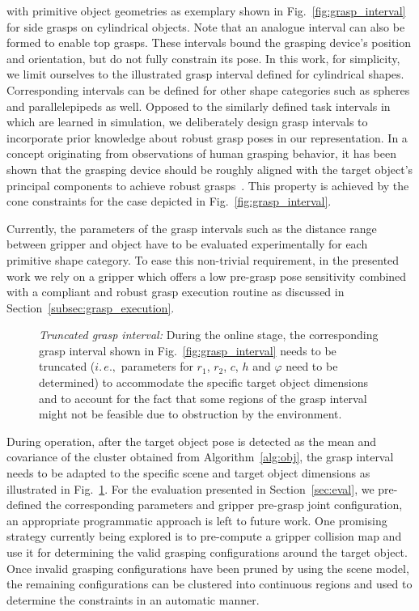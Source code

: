 with primitive object geometries as exemplary shown in Fig.~\ref{fig:grasp_interval} for side grasps
on cylindrical objects. Note that an analogue interval can also be formed to enable top
grasps. These intervals bound the grasping device's position and orientation, but do not fully
constrain its pose. In this work, for simplicity, we limit ourselves to the illustrated grasp
interval defined for cylindrical shapes. Corresponding intervals can be defined for other shape
categories such as spheres and parallelepipeds as well. Opposed to the similarly defined task
intervals in~\cite{Gien08a, Gien08b} which are learned in simulation, we deliberately design grasp
intervals to incorporate prior knowledge about robust grasp poses in our representation. In a
concept originating from observations of human grasping behavior, it has been shown that the
grasping device should be roughly aligned with the target object's principal components to achieve
robust grasps~\cite{Bala12}. This property is achieved by the cone constraints for the case depicted
in Fig.~\ref{fig:grasp_interval}.

Currently, the parameters of the grasp intervals such as the distance range between gripper and
object have to be evaluated experimentally for each primitive shape category. To ease this
non-trivial requirement, in the presented work we rely on a gripper which offers a low pre-grasp
pose sensitivity combined with a compliant and robust grasp execution routine as discussed in
Section~\ref{subsec:grasp_execution}.
%
\begin{figure}[t!] 
   \centering
    \def\svgwidth{235pt} 
     
    \caption{\textit{Truncated grasp interval:} During the online stage, the corresponding grasp
      interval shown in Fig.~\ref{fig:grasp_interval} needs to be truncated ($i.\,e.,$ parameters
      for $r_1$, $r_2$, $c$, $h$ and $\varphi$ need to be determined) to accommodate the specific
      target object dimensions and to account for the fact that some regions of the grasp interval
      might not be feasible due to obstruction by the environment.}
   \label{fig:truncated_grasp_interval}
   \vspace{-0.5cm}
\end{figure}

During operation, after the target object pose is detected as the mean and covariance of the cluster
obtained from Algorithm~\ref{alg:obj}, the grasp interval needs to be adapted to the specific scene
and target object dimensions as illustrated in Fig.~\ref{fig:truncated_grasp_interval}. For the
evaluation presented in Section~\ref{sec:eval}, we pre-defined the corresponding parameters and
gripper pre-grasp joint configuration, an appropriate programmatic approach is left to future work.
One promising strategy currently being explored is to pre-compute a gripper collision map and use it
for determining the valid grasping configurations around the target object. Once invalid grasping
configurations have been pruned by using the scene model, the remaining configurations can be
clustered into continuous regions and used to determine the constraints in an automatic manner.
%

